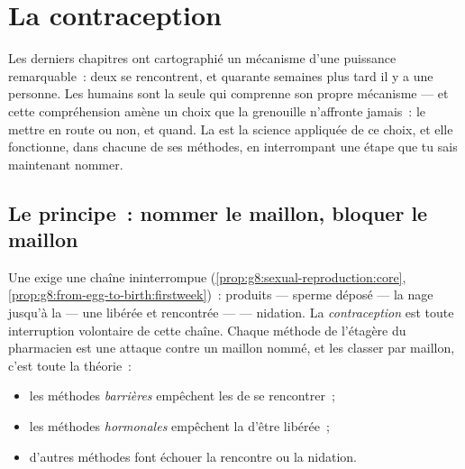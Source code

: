 \chapter{La contraception}\label{ch:g8:contraception}

Les derniers chapitres ont cartographié un mécanisme d'une puissance
remarquable~: deux  se rencontrent, et quarante semaines plus
tard il y a une personne. Les humains sont la seule  qui
comprenne son propre mécanisme --- et cette compréhension amène un
choix que la grenouille n'affronte jamais~: le mettre en route ou
non, et quand. La \emph{} est la science appliquée de ce
choix, et elle fonctionne, dans chacune de ses méthodes, en
interrompant une étape que tu sais maintenant nommer.

\section{Le principe~: nommer le maillon, bloquer le maillon}

\begin{proposition}\label{prop:g8:contraception:principle}
Une  exige une chaîne ininterrompue
(\cref{prop:g8:sexual-reproduction:core},
\cref{prop:g8:from-egg-to-birth:firstweek})~:  produits ---
sperme déposé --- la nage jusqu'à la  --- une 
libérée et rencontrée ---  --- nidation. La
\emph{contraception} est toute interruption
volontaire de cette chaîne. Chaque méthode de l'étagère du
pharmacien est une attaque contre un maillon nommé, et les classer
par maillon, c'est toute la théorie~:
\begin{itemize}
  \item les méthodes \emph{barrières} empêchent les  de se
        rencontrer~;
  \item les méthodes \emph{hormonales} empêchent la 
        d'être libérée~;
  \item d'autres méthodes font échouer la rencontre ou la nidation.
\end{itemize}
\end{proposition}
\admitted

